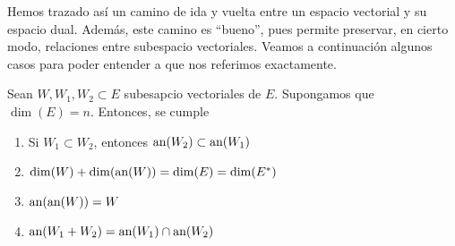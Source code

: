 Hemos trazado así un camino de ida y vuelta entre un espacio vectorial y su espacio dual. Además, este camino es ``bueno'', pues permite preservar, en cierto modo, relaciones entre subespacio vectoriales. Veamos a continuación algunos casos para poder entender a que nos referimos exactamente.
\begin{lem}\label{C1_lem_propiedadespasodual}
	Sean $W,W_1,W_2\subset E$ subesapcio vectoriales de $E$. Supongamos que $\dim(E)=n$. Entonces, se cumple
	\begin{enumerate}
		\item Si $W_1\subset W_2$, entonces $\text{an}(W_2)\subset \text{an}(W_1)$
		
		\item $\dim(W)+\dim(\text{an}(W))=\dim(E)=\dim(E^*)$
		
		\item $\text{an}(\text{an}(W))=W$
		
		\item $\text{an}(W_1+W_2)=\text{an}(W_1)\cap \text{an}(W_2)$
	\end{enumerate}
\end{lem}
